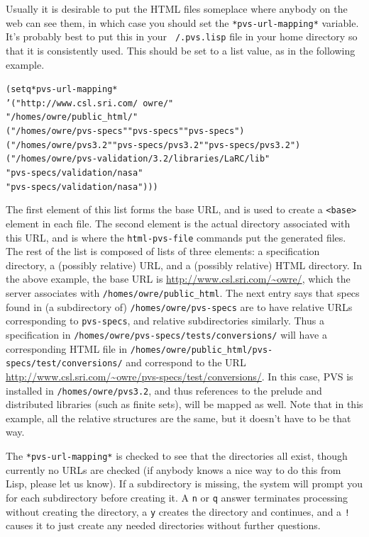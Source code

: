Usually it is desirable to put the HTML files someplace where anybody
on the web can see them, in which case you should set the
\texttt{*pvs-url-mapping*} variable.  It's probably best to put this in
your \texttt{~/.pvs.lisp} file in your home directory so that it is
consistently used.  This should be set to a list value, as in the
following example.
\begin{alltt}
  (setq *pvs-url-mapping*
        '("http://www.csl.sri.com/~owre/"
          "/homes/owre/public_html/"
          ("/homes/owre/pvs-specs" "pvs-specs" "pvs-specs")
          ("/homes/owre/pvs3.2" "pvs-specs/pvs3.2" "pvs-specs/pvs3.2")
          ("/homes/owre/pvs-validation/3.2/libraries/LaRC/lib"
           "pvs-specs/validation/nasa"
           "pvs-specs/validation/nasa")))
\end{alltt}
The first element of this list forms the base URL, and is used to
create a \texttt{<base>} element in each file.  The second element is
the actual directory associated with this URL, and is where the
\texttt{html-pvs-file} commands put the generated files.  The rest of
the list is composed of lists of three elements: a specification
directory, a (possibly relative) URL, and a (possibly relative) HTML
directory.  In the above example, the base URL is
\url{http://www.csl.sri.com/~owre/}, which the server associates with
\texttt{/homes/owre/public\_html}.  The next entry says that specs found
in (a subdirectory of) \texttt{/homes/owre/pvs-specs} are to have
relative URLs corresponding to \texttt{pvs-specs}, and relative
subdirectories similarly.  Thus a specification in
\texttt{/homes/owre/pvs-specs/tests/conversions/} will have a
corresponding HTML file in
\texttt{/homes/owre/public\_html/pvs-specs/test/conversions/} and
correspond to the URL
\url{http://www.csl.sri.com/~owre/pvs-specs/test/conversions/}.
In this case, PVS is installed in \texttt{/homes/owre/pvs3.2}, and thus
references to the prelude and distributed libraries (such as finite
sets), will be mapped as well.  Note that in this example, all the
relative structures are the same, but it doesn't have to be that way.

The \texttt{*pvs-url-mapping*} is checked to see that the directories
all exist, though currently no URLs are checked (if anybody knows a
nice way to do this from Lisp, please let us know).  If a subdirectory
is missing, the system will prompt you for each subdirectory before
creating it.  A \texttt{n} or \texttt{q} answer terminates processing
without creating the directory, a \texttt{y} creates the
directory and continues, and a \texttt{!} causes it to just create any
needed directories without further questions.

